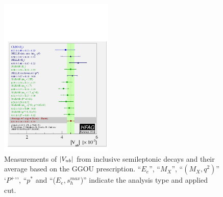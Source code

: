 \begin{figure}
\begin{center}
\includegraphics[width=0.48\textwidth]{figures/slb/vub_clnu_mc_GGOU.pdf}
\end{center}
\caption{Measurements of $|V_{ub}|$ from inclusive semileptonic decays 
and their average based on the GGOU prescription.
``$E_e$'', ``$M_X$'', ``$(M_X,q^2)$'' `$P^+$'', ``$p^*$ and ``($E_e,s^{max}_h$)''  indicate the
analysis type and applied cut.}
\label{fig:GGOU}
\end{figure}

